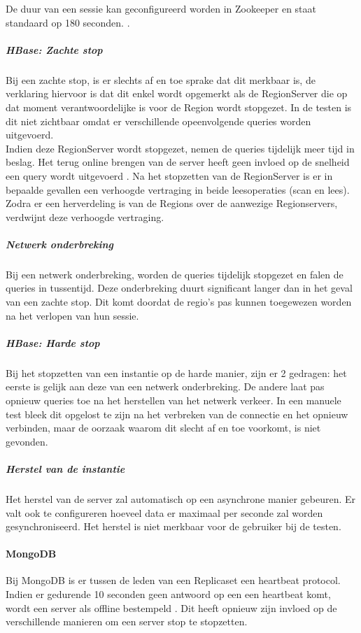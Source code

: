 De duur van een sessie kan geconfigureerd worden in Zookeeper en staat standaard op 180 seconden. \cite{hbase-doc}. 

\subparagraph{HBase: Zachte stop} Bij een zachte stop, is er slechts af en toe sprake dat dit merkbaar is, de verklaring hiervoor is dat dit enkel wordt opgemerkt als de RegionServer die op dat moment verantwoordelijke is voor de Region wordt stopgezet. In de testen is dit niet zichtbaar omdat er verschillende opeenvolgende queries worden uitgevoerd. \\
Indien deze RegionServer wordt stopgezet, nemen de queries tijdelijk meer tijd in beslag.  Het terug online brengen van de server heeft geen invloed op de snelheid een query wordt uitgevoerd . Na het stopzetten van de RegionServer is er in bepaalde gevallen een verhoogde vertraging in beide leesoperaties (scan en lees). \\
Zodra er een herverdeling is van de Regions over de aanwezige Regionservers, verdwijnt deze verhoogde vertraging. 

\subparagraph{Netwerk onderbreking} Bij een netwerk onderbreking, worden de queries tijdelijk stopgezet en falen de queries in tussentijd. Deze onderbreking duurt significant langer dan in het geval van een zachte stop. Dit komt doordat de regio's pas kunnen toegewezen worden na het verlopen van hun sessie.  

\subparagraph{HBase: Harde stop} Bij het stopzetten van een instantie op de harde manier, zijn er 2 gedragen: het eerste is gelijk aan deze van een netwerk onderbreking. De andere laat pas opnieuw queries toe na het herstellen van het netwerk verkeer. In een manuele test bleek dit opgelost te zijn na het verbreken van de connectie en het opnieuw verbinden, maar de oorzaak waarom dit slecht af en toe voorkomt, is niet gevonden. 

\subparagraph{Herstel van de instantie} Het herstel van de server zal automatisch op een asynchrone manier gebeuren. Er valt ook te configureren hoeveel data er maximaal per seconde zal worden gesynchroniseerd. Het herstel is niet merkbaar voor de gebruiker bij de testen. 

\paragraph{MongoDB} Bij MongoDB is er tussen de leden van een Replicaset een heartbeat protocol. Indien er gedurende 10 seconden geen antwoord op een een heartbeat komt, wordt een server als offline bestempeld \cite{mongodb-manual}. Dit heeft opnieuw zijn invloed op de verschillende manieren om een server stop te stopzetten. 

